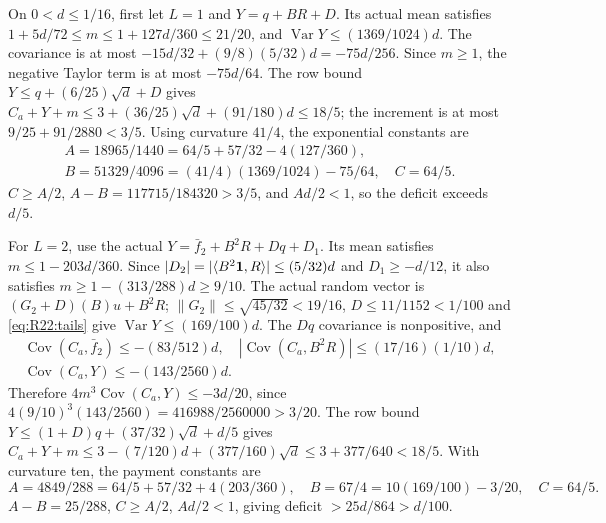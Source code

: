 On $0<d\le1/16$, first let $L=1$ and $Y=q+BR+D$.
Its actual mean satisfies
$1+5d/72\le m\le1+127d/360\le21/20$,
and $\operatorname{Var}Y\le(1369/1024)d$.
The covariance is at most
$-15d/32+(9/8)(5/32)d=-75d/256$.
Since $m\ge1$, the negative Taylor term is at most $-75d/64$.
The row bound $Y\le q+(6/25)\sqrt d+D$ gives
$C_a+Y+m\le3+(36/25)\sqrt d+(91/180)d\le18/5$;
the increment is at most $9/25+91/2880<3/5$.
Using curvature $41/4$, the exponential constants are
\[
\begin{gathered}
A=18965/1440=64/5+57/32-4(127/360),\\
B=51329/4096=(41/4)(1369/1024)-75/64,\quad C=64/5.
\end{gathered}
\]
$C\ge A/2$, $A-B=117715/184320>3/5$, and $Ad/2<1$,
so the deficit exceeds $d/5$.

For $L=2$, use the actual
$Y=\bar f_2+B^2R+Dq+D_1$.
Its mean satisfies $m\le1-203d/360$.
Since $|D_2|=|\langle B^2\mathbf1,R\rangle|\le(5/32)d$ and
$D_1\ge-d/12$, it also satisfies
$m\ge1-(313/288)d\ge9/10$.
The actual random vector is $(G_2+D)(B)u+B^2R$;
$\|G_2\|\le\sqrt{45/32}<19/16$, $D\le11/1152<1/100$ and
\eqref{eq:R22:tails} give $\operatorname{Var}Y\le(169/100)d$.
The $Dq$ covariance is nonpositive, and
\[
\begin{gathered}
\operatorname{Cov}(C_a,\bar f_2)\le-(83/512)d,\quad |\operatorname{Cov}(C_a,B^2R)|\le(17/16)(1/10)d,\\
\operatorname{Cov}(C_a,Y)\le-(143/2560)d.
\end{gathered}
\]
Therefore $4m^3\operatorname{Cov}(C_a,Y)\le-3d/20$, since
$4(9/10)^3(143/2560)=416988/2560000>3/20$.
The row bound $Y\le(1+D)q+(37/32)\sqrt d+d/5$ gives
$C_a+Y+m\le3-(7/120)d+(377/160)\sqrt d
\le3+377/640<18/5$.
With curvature ten, the payment constants are
\[
A=4849/288=64/5+57/32+4(203/360),\quad
B=67/4=10(169/100)-3/20,\quad C=64/5.
\]
$A-B=25/288$, $C\ge A/2$, $Ad/2<1$, giving deficit
$>25d/864>d/100$.

